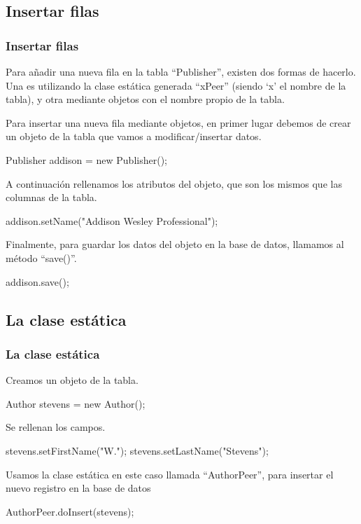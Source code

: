 \documentclass[24pt, a4paper, oneside, spanish]{beamer}
\begin{document}
	\subsection{Insertar filas}
	\begin{frame}
	\frametitle{Insertar filas}
	Para añadir una nueva fila en la tabla “Publisher”, existen dos formas de hacerlo. Una es utilizando la clase estática generada “xPeer” (siendo ‘x’ el nombre de la tabla), y otra mediante objetos con el nombre propio de la tabla.

Para insertar una nueva fila mediante objetos, en primer lugar debemos de crear un objeto de la tabla que vamos a modificar/insertar datos.

Publisher addison = new Publisher();

A continuación rellenamos los atributos del objeto, que son los mismos que las columnas de la tabla.

addison.setName("Addison Wesley Professional");

Finalmente, para guardar los datos del objeto en la base de datos, llamamos al método “save()”.

addison.save();
	\end{frame}
	
	\subsection{La clase estática}
	\begin{frame}
	\frametitle{La clase estática}
	\setbeamercovered{invisible}
	Creamos un objeto de la tabla.

Author stevens = new Author();

Se rellenan los campos.

stevens.setFirstName("W.");
stevens.setLastName("Stevens");

Usamos la clase estática en este caso llamada “AuthorPeer”, para insertar el nuevo registro en la base de datos

AuthorPeer.doInsert(stevens);
	\end{frame}
	
\end{document}
